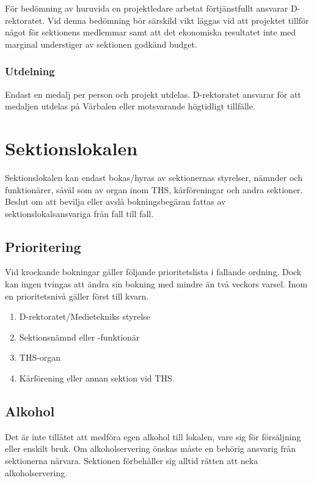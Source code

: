 \documentclass{dgovdoc}
\begin{document}
För bedömning av huruvida en projektledare arbetat förtjänstfullt ansvarar
D-rektoratet. Vid denna bedömning bör särskild vikt läggas vid att projektet
tillför något för sektionens medlemmar samt att det ekonomiska resultatet inte
med marginal understiger av sektionen godkänd budget.

\subsubsection{Utdelning}

Endast en medalj per person och projekt utdelas. D-rektoratet ansvarar för att
medaljen utdelas på Vårbalen eller motsvarande högtidligt tillfälle.

\section{Sektionslokalen}

Sektionslokalen kan endast bokas/hyras av sektionernas styrelser, nämnder och
funktionärer, såväl som av organ inom THS, kårföreningar och andra sektioner.
Beslut om att bevilja eller avslå bokningsbegäran fattas av
sektionslokalsansvariga från fall till fall.

\subsection{Prioritering}

Vid krockande bokningar gäller följande prioritetslista i fallande ordning.
Dock kan ingen tvingas att ändra sin bokning med mindre än två veckors varsel.
Inom en prioritetsnivå gäller först till kvarn.

\begin{enumerate}
  \item D-rektoratet/Medietekniks styrelse
  \item Sektionsnämnd eller -funktionär
  \item THS-organ
  \item Kårförening eller annan sektion vid THS.
\end{enumerate}

\subsection{Alkohol}

Det är inte tillåtet att medföra egen alkohol till lokalen, vare sig för
försäljning eller enskilt bruk. Om alkoholservering önskas måste en behörig
ansvarig från sektionerna närvara. Sektionen förbehåller sig alltid rätten att
neka alkoholservering.
\end{document}
